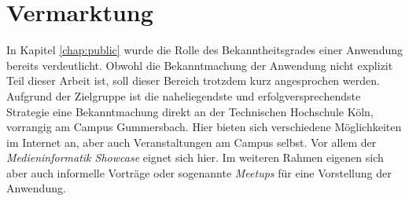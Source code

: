 \section{Vermarktung}
In Kapitel \ref{chap:public} wurde die Rolle des Bekanntheitsgrades einer Anwendung bereits verdeutlicht. Obwohl die Bekanntmachung der Anwendung nicht explizit Teil dieser Arbeit ist, soll dieser Bereich trotzdem kurz angesprochen werden.\\
Aufgrund der Zielgruppe ist die naheliegendste und erfolgversprechendste Strategie eine Bekanntmachung direkt an der Technischen Hochschule Köln, vorrangig am Campus Gummersbach. Hier bieten sich verschiedene Möglichkeiten im Internet an, aber auch Veranstaltungen am Campus selbst. Vor allem der \textit{Medieninformatik Showcase} eignet sich hier.
Im weiteren Rahmen eigenen sich aber auch informelle Vorträge oder sogenannte \textit{Meetups} für eine Vorstellung der Anwendung.

